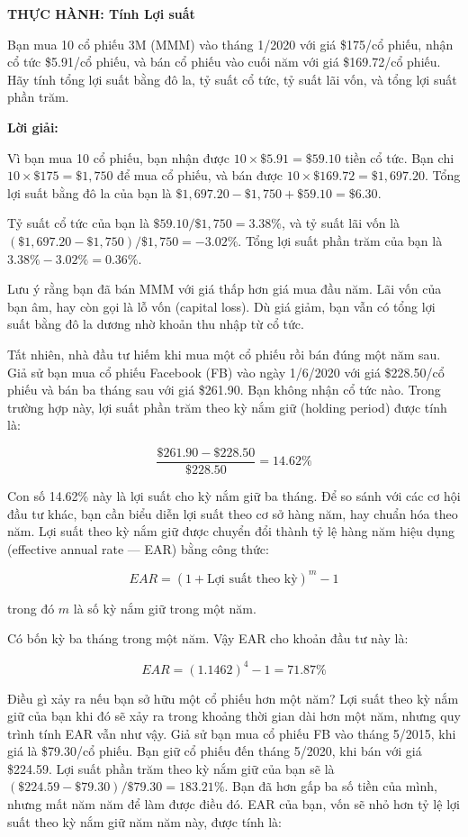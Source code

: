 \begin{framed}
\textbf{THỰC HÀNH: Tính Lợi suất}

Bạn mua 10 cổ phiếu 3M (MMM) vào tháng 1/2020 với giá \$175/cổ phiếu, nhận cổ tức \$5.91/cổ phiếu, và bán cổ phiếu vào cuối năm với giá \$169.72/cổ phiếu. Hãy tính tổng lợi suất bằng đô la, tỷ suất cổ tức, tỷ suất lãi vốn, và tổng lợi suất phần trăm.

\textbf{Lời giải:}

Vì bạn mua 10 cổ phiếu, bạn nhận được $10 \times \$5.91 = \$59.10$ tiền cổ tức. Bạn chi $10 \times \$175 = \$1{,}750$ để mua cổ phiếu, và bán được $10 \times \$169.72 = \$1{,}697.20$. Tổng lợi suất bằng đô la của bạn là $\$1{,}697.20 - \$1{,}750 + \$59.10 = \$6.30$.

Tỷ suất cổ tức của bạn là $\$59.10 / \$1{,}750 = 3.38\%$, và tỷ suất lãi vốn là $(\$1{,}697.20 - \$1{,}750)/\$1{,}750 = -3.02\%$. Tổng lợi suất phần trăm của bạn là $3.38\% - 3.02\% = 0.36\%$.

Lưu ý rằng bạn đã bán MMM với giá thấp hơn giá mua đầu năm. Lãi vốn của bạn âm, hay còn gọi là lỗ vốn (capital loss). Dù giá giảm, bạn vẫn có tổng lợi suất bằng đô la dương nhờ khoản thu nhập từ cổ tức.
\end{framed}

Tất nhiên, nhà đầu tư hiếm khi mua một cổ phiếu rồi bán đúng một năm sau. Giả sử bạn mua cổ phiếu Facebook (FB) vào ngày 1/6/2020 với giá \$228.50/cổ phiếu và bán ba tháng sau với giá \$261.90. Bạn không nhận cổ tức nào. Trong trường hợp này, lợi suất phần trăm theo kỳ nắm giữ (holding period) được tính là:

$$
\frac{\$261.90 - \$228.50}{\$228.50} = 14.62\%
$$

Con số 14.62\% này là lợi suất cho kỳ nắm giữ ba tháng. Để so sánh với các cơ hội đầu tư khác, bạn cần biểu diễn lợi suất theo cơ sở hàng năm, hay chuẩn hóa theo năm. Lợi suất theo kỳ nắm giữ được chuyển đổi thành tỷ lệ hàng năm hiệu dụng (effective annual rate — EAR) bằng công thức:

$$
EAR = (1 + \text{Lợi suất theo kỳ})^{m} - 1
$$

trong đó $m$ là số kỳ nắm giữ trong một năm.

Có bốn kỳ ba tháng trong một năm. Vậy EAR cho khoản đầu tư này là:

$$
EAR = (1.1462)^{4} - 1 = 71.87\%
$$

Điều gì xảy ra nếu bạn sở hữu một cổ phiếu hơn một năm? Lợi suất theo kỳ nắm giữ của bạn khi đó sẽ xảy ra trong khoảng thời gian dài hơn một năm, nhưng quy trình tính EAR vẫn như vậy. Giả sử bạn mua cổ phiếu FB vào tháng 5/2015, khi giá là \$79.30/cổ phiếu. Bạn giữ cổ phiếu đến tháng 5/2020, khi bán với giá \$224.59. Lợi suất phần trăm theo kỳ nắm giữ của bạn sẽ là $(\$224.59-\$79.30)/\$79.30 = 183.21\%$. Bạn đã hơn gấp ba số tiền của mình, nhưng mất năm năm để làm được điều đó. EAR của bạn, vốn sẽ nhỏ hơn tỷ lệ lợi suất theo kỳ nắm giữ năm năm này, được tính là:

